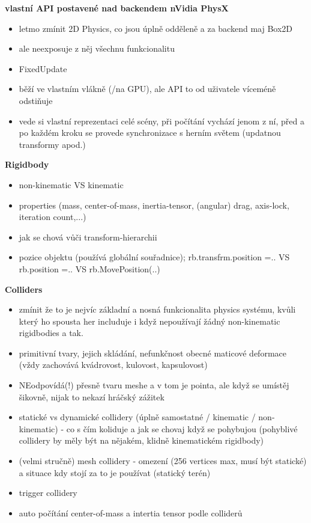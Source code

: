 \textbf{vlastní API postavené nad backendem nVidia PhysX}
\begin{itemize}
    \item letmo zmínit 2D Physics, co jsou úplně odděleně a za backend maj Box2D 
    \item ale neexposuje z něj všechnu funkcionalitu
    \item FixedUpdate
    \item běží ve vlastním vlákně (/na GPU), ale API to od uživatele víceméně odstiňuje
    \item vede si vlastní reprezentaci celé scény, při počítání vychází jenom z ní, před a po každém kroku se provede synchronizace s herním světem (updatnou transformy apod.)
\end{itemize}


\textbf{Rigidbody}
\begin{itemize}
    \item non-kinematic VS kinematic
    \item properties (mass, center-of-mass, inertia-tensor, (angular) drag, axis-lock, iteration count,...)
    \item jak se chová vůči transform-hierarchii
    \item pozice objektu (používá globální souřadnice); rb.transfrm.position =.. VS rb.position =.. VS rb.MovePosition(..)
\end{itemize}

\textbf{Colliders}
\begin{itemize}
    \item zmínit že to je nejvíc základní a nosná funkcionalita physics systému, kvůli který ho spousta her includuje i když nepoužívají žádný non-kinematic rigidbodies a tak.  
    \item primitivní tvary, jejich skládání, nefunkčnost obecné maticové deformace (vždy zachovává kvádrovost, kulovost, kapsulovost)
    \item NEodpovídá(!) přesně tvaru meshe a v tom je pointa, ale když se umístěj šikovně, nijak to nekazí hráčský zážitek
    \item statické vs dynamické collidery (úplně samostatné / kinematic / non-kinematic) - co s čím koliduje a jak se chovaj když se pohybujou (pohyblivé collidery by měly být na nějakém, klidně kinematickém rigidbody)
    \item (velmi stručně) mesh collidery - omezení (256 vertices max, musí být statické) a situace kdy stojí za to je používat (statický terén)
    \item trigger collidery
    \item auto počítání center-of-mass a intertia tensor podle colliderů
\end{itemize}

